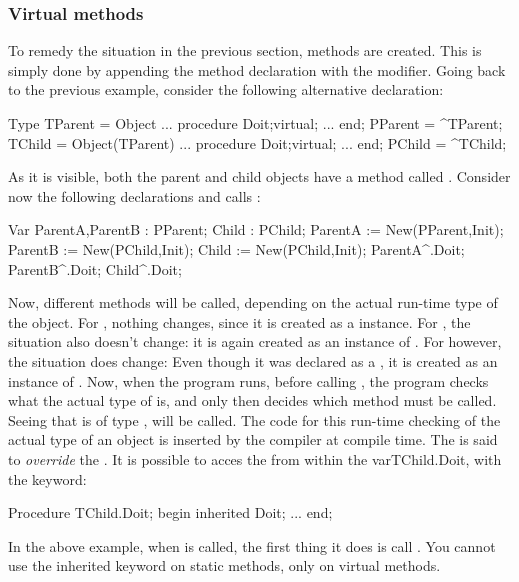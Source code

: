 \documentclass{report}
\begin{document}
\subsubsection{Virtual methods}
To remedy the situation in the previous section,  methods are
created. This is simply done by appending the method declaration with the
 modifier.
Going back to the previous example, consider the following alternative
declaration:
\begin{listing}
Type
  TParent = Object 
    ...
    procedure Doit;virtual;
    ...
    end;
  PParent = ^TParent;
  TChild = Object(TParent) 
    ...
    procedure Doit;virtual;
    ...
    end;
  PChild = ^TChild;  
\end{listing}
As it is visible, both the parent and child objects have a method called
. Consider now the following declarations and calls :
\begin{listing}
Var ParentA,ParentB : PParent;
    Child           : PChild;
   ParentA := New(PParent,Init);
   ParentB := New(PChild,Init);
   Child := New(PChild,Init);
   ParentA^.Doit;
   ParentB^.Doit;
   Child^.Doit;
\end{listing}
Now, different methods will be called, depending on the actual run-time type
of the object. For , nothing changes, since it is created as
a  instance. For , the situation also doesn't
change: it is again created as an instance of .
For  however, the situation does change: Even though it was
declared as a , it is created as an instance of .
Now, when the program runs, before calling , the program
checks what the actual type of  is, and only then decides which
method must be called. Seeing that  is of type ,
 will be called.
The code for this run-time checking of the actual type of an object is
inserted by the compiler at compile time.
The  is said to {\em override} the .
It is possible to acces the  from within the
var{TChild.Doit}, with the  keyword:
\begin{listing}
Procedure TChild.Doit;
begin
  inherited Doit; 
  ...
end;
\end{listing}
In the above example, when  is called, the first thing it
does is call . You cannot use the inherited keyword on 
static methods, only on virtual methods.
\end{document}

